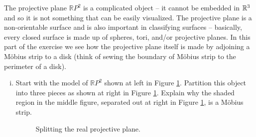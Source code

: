 \item The projective plane $\mathbb{R}P^2$ is a complicated object -- it cannot be embedded in $\mathbb{R}^3$ and so it is not something that can be easily visualized. The projective plane is a non-orientable surface and is also important in classifying surfaces -- basically, every closed surface is made up of spheres, tori, and/or projective planes. In this part of the exercise we see how the projective plane itself is made by adjoining a M{\"o}bius strip to a disk (think of sewing the boundary of M{\"o}bius strip to the perimeter of a disk). 
	\begin{enumerate}[i.]
	
	\item Start with the model of $\mathbb{R}P^2$ shown at left in Figure \ref{F:projective_2}. Partition this object into three pieces as shown at right in Figure \ref{F:projective_2}. Explain why the shaded region in the middle figure, separated out at right in Figure \ref{F:projective_2}, is a M{\"o}bius strip. 

\begin{center}
\begin{figure}[h]
\begin{center}
 \hspace{0.25in}  \hspace{0.25in} \begin{minipage}{0.75in} {\vspace{-1.0in} } \end{minipage}
\caption{Splitting the real projective plane.} 
\label{F:projective_2}
\end{center}
\end{figure}
\end{center}


\end{enumerate}
